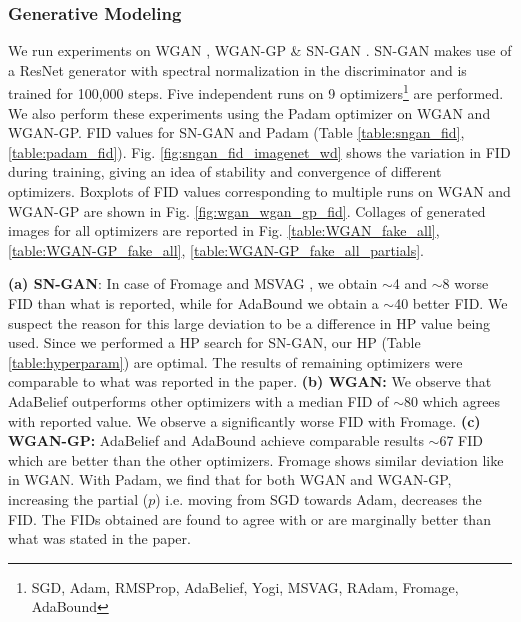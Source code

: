 \subsubsection{Generative Modeling}
\label{lab:Generative_modeling}
 We run experiments on WGAN \cite{WGAN}, WGAN-GP \cite{WGAN-GP} \& SN-GAN \cite{SN-GAN}. SN-GAN makes use of a ResNet generator with spectral normalization in the discriminator and is trained for 100,000 steps. Five independent runs on 9 optimizers\footnote{\label{fnote:optim_list_gan}SGD, Adam, RMSProp, AdaBelief, Yogi, MSVAG, RAdam, Fromage, AdaBound} are performed. We also perform these experiments using the Padam \cite{padam} optimizer on WGAN and WGAN-GP.  FID values for SN-GAN and Padam (Table \ref{table:sngan_fid}, \ref{table:padam_fid}). Fig. \ref{fig:sngan_fid_imagenet_wd} shows the variation in FID during training, giving an idea of stability and convergence of different optimizers. Boxplots of FID values corresponding to multiple runs on WGAN and WGAN-GP are shown in Fig. \ref{fig:wgan_wgan_gp_fid}. Collages of generated images for all optimizers are reported in Fig. \ref{table:WGAN_fake_all}, \ref{table:WGAN-GP_fake_all}, \ref{table:WGAN-GP_fake_all_partials}.
 
\textbf{(a) SN-GAN}: In case of Fromage \cite{Fromage} and MSVAG \cite{MSVAG}, we obtain $\sim$4 and $\sim$8 worse FID than what is reported, while for AdaBound \cite{AdaBound} we obtain a $\sim$40 better FID. We suspect the reason for this large deviation to be a difference in HP value being used. Since we performed a HP search for SN-GAN, our HP (Table \ref{table:hyperparam}) are optimal. The results of remaining optimizers were comparable to what was reported in the paper. \textbf{(b) WGAN:} We observe that AdaBelief outperforms other optimizers with a median FID of $\sim$80 which agrees with reported value. We observe a significantly worse FID with Fromage. \textbf{(c) WGAN-GP:} AdaBelief and AdaBound achieve comparable results $\sim$67 FID which are better than the other optimizers. Fromage shows similar deviation like in WGAN. With Padam, we find that for both WGAN and WGAN-GP, increasing the partial ($p$) i.e. moving from SGD towards Adam, decreases the FID. The FIDs obtained are found to agree with or are marginally better than what was stated in the paper.



